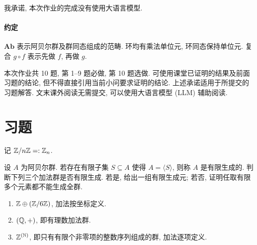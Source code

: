 \documentclass{article}
\begin{document}
我承诺, 本次作业的完成没有使用大语言模型.

\paragraph{约定} $\mathbf{Ab}$ 表示阿贝尔群及群同态组成的范畴. 环均有乘法单位元, 环同态保持单位元. 复合 $g\circ f$ 表示先做 $f$, 再做 $g$.

本次作业共 10 题, 第 1--9 题必做, 第 10 题选做. 可使用课堂已证明的结果及前面习题的结论, 但不得直接引用当前小问要求证明的结论. 上述承诺适用于所提交的习题解答. 文末课外阅读无需提交, 可以使用大语言模型 (LLM) 辅助阅读.

\section*{习题}

记 $\mathbb{Z}/n\mathbb{Z} =: \mathbb{Z}_n$.

\begin{problem}
设 $A$ 为阿贝尔群. 若存在有限子集 $S\subseteq A$ 使得 $A=\langle S\rangle$, 则称 $A$ 是有限生成的. 判断下列三个加法群是否有限生成. 若是, 给出一组有限生成元; 若否, 证明任取有限多个元素都不能生成全群.
\begin{enumerate}
  \item[(a)] $\mathbb{Z}\oplus(\mathbb{Z}/6\mathbb{Z})$, 加法按坐标定义.
  \item[(b)] $(\mathbb{Q},+)$, 即有理数加法群.
  \item[(c)] $\mathbb{Z}^{(\mathbb{N})}$, 即只有有限个非零项的整数序列组成的群, 加法逐项定义.
\end{enumerate}
\end{problem}
\end{document}
